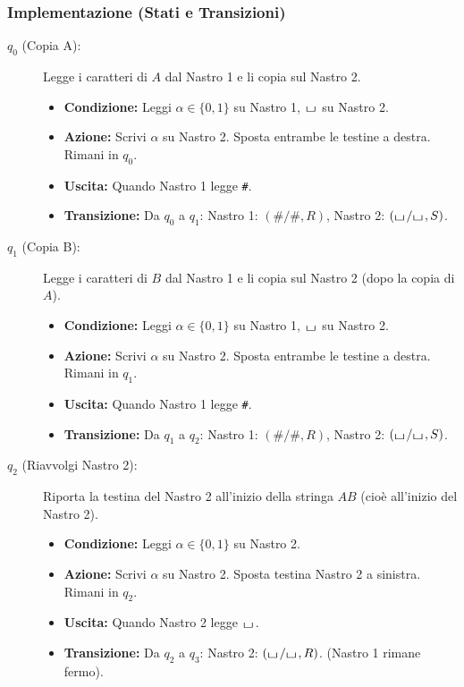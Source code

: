 \documentclass[a4paper]{article}
\theoremstyle{definition} %
\newcommand{\blankS}{\ensuremath{\raisebox{-0.15ex}{\scalebox{1.3}[0.7]{$\sqcup$}}\mkern2mu}}
\begin{document}
\subsubsection{Implementazione (Stati e Transizioni)}
\begin{description}
    \item[$q_0$ (Copia A):] Legge i caratteri di $A$ dal Nastro 1 e li copia sul Nastro 2.
    \begin{itemize}
        \item \textbf{Condizione:} Leggi $\alpha \in \{0,1\}$ su Nastro 1, $\blankS$ su Nastro 2.
        \item \textbf{Azione:} Scrivi $\alpha$ su Nastro 2. Sposta entrambe le testine a destra. Rimani in $q_0$.
        \item \textbf{Uscita:} Quando Nastro 1 legge \texttt{\#}.
        \item \textbf{Transizione:} Da $q_0$ a $q_1$: Nastro 1: $(\texttt{\#}/\texttt{\#}, R)$, Nastro 2: $(\blankS/\blankS, S)$.
    \end{itemize}
    \item[$q_1$ (Copia B):] Legge i caratteri di $B$ dal Nastro 1 e li copia sul Nastro 2 (dopo la copia di $A$).
    \begin{itemize}
        \item \textbf{Condizione:} Leggi $\alpha \in \{0,1\}$ su Nastro 1, $\blankS$ su Nastro 2.
        \item \textbf{Azione:} Scrivi $\alpha$ su Nastro 2. Sposta entrambe le testine a destra. Rimani in $q_1$.
        \item \textbf{Uscita:} Quando Nastro 1 legge \texttt{\#}.
        \item \textbf{Transizione:} Da $q_1$ a $q_2$: Nastro 1: $(\texttt{\#}/\texttt{\#}, R)$, Nastro 2: $(\blankS/\blankS, S)$.
    \end{itemize}
    \item[$q_2$ (Riavvolgi Nastro 2):] Riporta la testina del Nastro 2 all'inizio della stringa $AB$ (cioè all'inizio del Nastro 2).
    \begin{itemize}
        \item \textbf{Condizione:} Leggi $\alpha \in \{0,1\}$ su Nastro 2.
        \item \textbf{Azione:} Scrivi $\alpha$ su Nastro 2. Sposta testina Nastro 2 a sinistra. Rimani in $q_2$.
        \item \textbf{Uscita:} Quando Nastro 2 legge $\blankS$.
        \item \textbf{Transizione:} Da $q_2$ a $q_3$: Nastro 2: $(\blankS/\blankS, R)$. (Nastro 1 rimane fermo).

\end{itemize}
\end{description}
\end{document}
